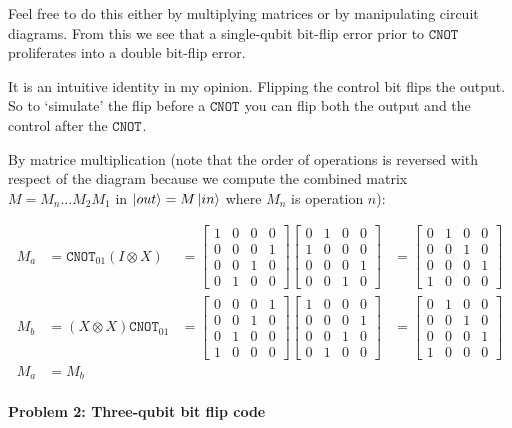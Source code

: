 \documentclass[12pt]{article}
\newcommand{\bmat}[1]{\begin{bmatrix}#1\end{bmatrix}}
\newenvironment{answer}{\begingroup\setlength{\leftskip}{-\leftmargin}\begin{framed}}{\end{framed}\endgroup}
\newcommand{\CNOT}[1]{\ensuremath{\texttt{CNOT}_{#1}}}
\begin{document}
\begin{enumerate}
    Feel free to do this either by multiplying matrices or by manipulating circuit diagrams. From this we see that a single-qubit bit-flip error prior to \CNOT{} proliferates into a double bit-flip error.

    \begin{answer}
        It is an intuitive identity in my opinion. Flipping the control bit flips the output. So to `simulate' the flip before a \CNOT{} you can flip both the output and the control after the \CNOT{}.

        By matrice multiplication (note that the order of operations is reversed with respect of the diagram because we compute the combined matrix $M = M_n\dots{}M_2M_1$ in $\ket{out} = M\ket{in}$ where $M_n$ is operation $n$):

        \begin{align*}
            M_a &= \CNOT{01}(I \otimes X) &=
                \bmat{1&0&0&0\\0&0&0&1\\0&0&1&0\\0&1&0&0}
                \bmat{0&1&0&0\\1&0&0&0\\0&0&0&1\\0&0&1&0} &=
                \bmat{0&1&0&0\\0&0&1&0\\0&0&0&1\\1&0&0&0}\\
            M_b &= (X \otimes X)\CNOT{01} &=
                \bmat{0&0&0&1\\0&0&1&0\\0&1&0&0\\1&0&0&0}
                \bmat{1&0&0&0\\0&0&0&1\\0&0&1&0\\0&1&0&0} &=
                \bmat{0&1&0&0\\0&0&1&0\\0&0&0&1\\1&0&0&0}\\
            M_a &= M_b
        \end{align*}
    \end{answer}
\end{enumerate}

\paragraph{Problem 2: Three-qubit bit flip code} \hfill
\end{document}
